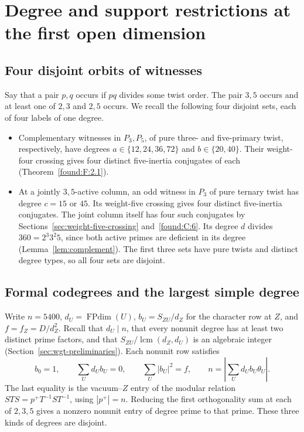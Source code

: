 \documentclass[11pt,a4paper]{article}
\numberwithin{equation}{section}
\theoremstyle{remark}
\newcommand{\lcm}{\operatorname{lcm}}
\begin{document}
\section{Degree and support restrictions at the first open dimension}\label{found:group:degrees}

\subsection{Four disjoint orbits of witnesses}\label{found:R:2}
\label{found:R:key:sec:quartets}

Say that a pair $p,q$ occurs if $pq$ divides some twist order. The pair $3,5$ occurs and at least one of $2,3$ and $2,5$ occurs. We recall the following four disjoint sets, each of four labels of one degree.
\begin{itemize}
\item Complementary witnesses in $P_3,P_5$, of pure three- and five-primary twist, respectively, have degrees $a\in\{12,24,36,72\}$ and $b\in\{20,40\}$. Their weight-four crossing gives four distinct five-inertia conjugates of each (Theorem~\ref{found:F:2.1}).
\item At a jointly $3,5$-active column, an odd witness in $P_3$ of pure ternary twist has degree $c=15$ or $45$. Its weight-five crossing gives four distinct five-inertia conjugates. The joint column itself has four such conjugates by Sections~\ref{sec:weight-five-crossing} and~\ref{found:C:6}. Its degree $d$ divides $360=2^3 3^2 5$, since both active primes are deficient in its degree (Lemma~\ref{lem:complement}). The first three sets have pure twists and distinct degree types, so all four sets are disjoint.
\end{itemize}

\subsection{Formal codegrees and the largest simple degree}\label{found:R:1}
Write $n=5400$, $d_U=\operatorname{FPdim}(U)$, $b_U=S_{ZU}/d_Z$ for the character row at $Z$, and $f=f_Z=D/d_Z^2$. Recall that $d_U\mid n$, that every nonunit degree has at least two distinct prime factors, and that $S_{ZU}/\lcm(d_Z,d_U)$ is an algebraic integer (Section~\ref{sec:wgt-preliminaries}). Each nonunit row satisfies
\[
 b_0=1,\qquad \sum_U d_U b_U=0,\qquad
 \sum_U |b_U|^2=f,\qquad n=\left|\sum_U d_U b_U\theta_U\right|.
\]
The last equality is the vacuum--$Z$ entry of the modular relation $STS=p^+T^{-1}ST^{-1}$, using $|p^+|=n$. Reducing the first orthogonality sum at each of $2,3,5$ gives a nonzero nonunit entry of degree prime to that prime. These three kinds of degrees are disjoint.
\end{document}
